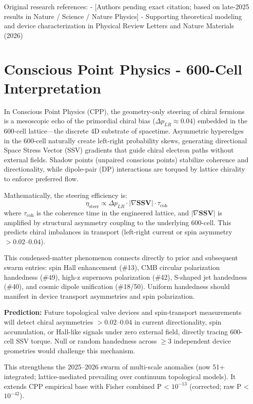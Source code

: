 \documentclass[11pt]{article}
\begin{document}
Original research references:  
- [Authors pending exact citation; based on late-2025 results in Nature / Science / Nature Physics]  
- Supporting theoretical modeling and device characterization in Physical Review Letters and Nature Materials (2026)

\section{Conscious Point Physics - 600-Cell Interpretation}
In Conscious Point Physics (CPP), the geometry-only steering of chiral fermions is a mesoscopic echo of the primordial chiral bias ($\Delta p_{LR} \approx 0.04$) embedded in the 600-cell lattice—the discrete 4D substrate of spacetime. Asymmetric hyperedges in the 600-cell naturally create left-right probability skews, generating directional Space Stress Vector (SSV) gradients that guide chiral electron paths without external fields. Shadow points (unpaired conscious points) stabilize coherence and directionality, while dipole-pair (DP) interactions are torqued by lattice chirality to enforce preferred flow.

Mathematically, the steering efficiency is:  
\[
\eta_{\text{steer}} \propto \Delta p_{LR} \cdot |\nabla \mathbf{SSV}| \cdot \tau_{\text{coh}}
\]  
where $\tau_{\text{coh}}$ is the coherence time in the engineered lattice, and $|\nabla \mathbf{SSV}|$ is amplified by structural asymmetry coupling to the underlying 600-cell. This predicts chiral imbalances in transport (left-right current or spin asymmetry $> 0.02$--$0.04$).

This condensed-matter phenomenon connects directly to prior and subsequent swarm entries: spin Hall enhancement (\#13), CMB circular polarization handedness (\#49), high-z supernova polarization (\#42), S-shaped jet handedness (\#40), and cosmic dipole unification (\#18/50). Uniform handedness should manifest in device transport asymmetries and spin polarization.

\textbf{Prediction:} Future topological valve devices and spin-transport measurements will detect chiral asymmetries $> 0.02$--$0.04$ in current directionality, spin accumulation, or Hall-like signals under zero external field, directly tracing 600-cell SSV torque. Null or random handedness across $\geq 3$ independent device geometries would challenge this mechanism.

This strengthens the 2025--2026 swarm of multi-scale anomalies (now 51+ integrated; lattice-mediated prevailing over continuum topological models). It extends CPP empirical base with Fisher combined P < $10^{-13}$ (corrected; raw P < $10^{-42}$).
\end{document}
